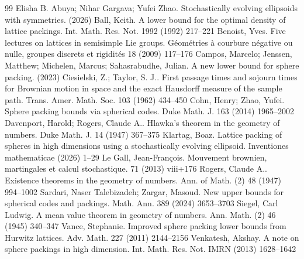 \documentclass[10pt,a4paper]{amsart}
\begin{document}
\begin{thebibliography}{99}
 Elisha B. Abuya; Nihar Gargava; Yufei Zhao. Stochastically evolving ellipsoids with symmetries. (2026)
 Ball, Keith. A lower bound for the optimal density of lattice packings. Int. Math. Res. Not. 1992 (1992) 217--221
 Benoist, Yves. Five lectures on lattices in semisimple {L}ie groups. G\'eom\'etries \`a{} courbure n\'egative ou nulle, groupes discrets et rigidit\'es 18 (2009) 117--176
 Campos, Marcelo; Jenssen, Matthew; Michelen, Marcus; Sahasrabudhe, Julian. A new lower bound for sphere packing. (2023)
 Ciesielski, Z.; Taylor, S. J.. First passage times and sojourn times for {B}rownian motion in space and the exact {H}ausdorff measure of the sample path. Trans. Amer. Math. Soc. 103 (1962) 434--450
 Cohn, Henry; Zhao, Yufei. Sphere packing bounds via spherical codes. Duke Math. J. 163 (2014) 1965--2002
 Davenport, Harold; Rogers, Claude A.. Hlawka's theorem in the geometry of numbers. Duke Math. J. 14 (1947) 367--375
 Klartag, Boaz. Lattice packing of spheres in high dimensions using a stochastically evolving ellipsoid. Inventiones mathematicae (2026) 1--29
 Le Gall, Jean-Fran{\c c}ois. Mouvement brownien, martingales et calcul stochastique. 71 (2013) viii+176
 Rogers, Claude A.. Existence theorems in the geometry of numbers. Ann. of Math. (2) 48 (1947) 994--1002
 Sardari, Naser Talebizadeh; Zargar, Masoud. New upper bounds for spherical codes and packings. Math. Ann. 389 (2024) 3653--3703
 Siegel, Carl Ludwig. A mean value theorem in geometry of numbers. Ann. Math. (2) 46 (1945) 340--347
 Vance, Stephanie. Improved sphere packing lower bounds from {Hurwitz} lattices. Adv. Math. 227 (2011) 2144--2156
 Venkatesh, Akshay. A note on sphere packings in high dimension. Int. Math. Res. Not. IMRN (2013) 1628--1642
\end{thebibliography}
\end{document}
